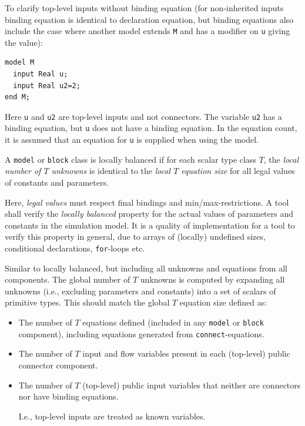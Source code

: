 \begin{nonnormative}
To clarify top-level inputs without binding equation (for non-inherited inputs binding equation is identical to declaration equation, but binding equations also include the case where another model extends \lstinline!M! and has a modifier on \lstinline!u! giving the value):
\begin{lstlisting}[language=modelica]
model M
  input Real u;
  input Real u2=2;
end M;
\end{lstlisting}

Here \lstinline!u! and \lstinline!u2! are top-level inputs and not connectors.
The variable \lstinline!u2! has a binding equation, but \lstinline!u! does not have a binding equation.
In the equation count, it is assumed that an equation for \lstinline!u! is supplied when using the model.
\end{nonnormative}

\begin{definition}
A \lstinline!model! or \lstinline!block! class is locally balanced if for each scalar type class $T$, the \emph{local number of $T$ unknowns} is identical to the \emph{local $T$ equation size} for all legal values of constants and parameters.
\end{definition}

\begin{nonnormative}
Here, \emph{legal values} must respect final bindings and min/max-restrictions.
A tool shall verify the \emph{locally balanced} property for the actual values of parameters and constants in the simulation model.
It is a quality of implementation for a tool to verify this property in general, due to arrays of (locally) undefined sizes, conditional declarations, \lstinline!for!-loops etc.
\end{nonnormative}

\begin{definition}
Similar to locally balanced, but including all unknowns and equations from all components.
The global number of $T$ unknowns is computed by expanding all unknowns (i.e., excluding parameters and constants) into a set of scalars of primitive types.
This should match the global $T$ equation size defined as:
\begin{itemize}
\item
  The number of $T$ equations defined (included in any \lstinline!model! or \lstinline!block! component), including equations generated from \lstinline!connect!-equations.
\item
  The number of $T$ input and flow variables present in each (top-level) public connector component.
\item
  The number of $T$ (top-level) public input variables that neither are connectors nor have binding equations.
  \begin{nonnormative}
  I.e., top-level inputs are treated as known variables.
  \end{nonnormative}
\end{itemize}
\end{definition}

